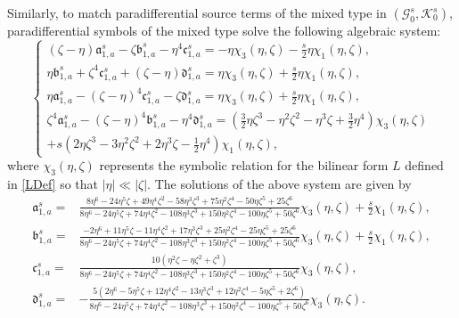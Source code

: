 \documentclass[10pt]{amsart}
\theoremstyle{remark}
\theoremstyle{definition}
\numberwithin{equation}{section}
\newcommand{\f}{\frac}
\begin{document}
Similarly, to match  paradifferential source terms of the mixed type in $(\mathcal{G}_0^s, \mathcal{K}_0^s)$, paradifferential symbols of the mixed type solve the following algebraic system:
\begin{equation*}
\begin{cases}
(\zeta-\eta)\mathfrak{a}^s_{1, a}-\zeta\mathfrak{b}^s_{1, a}-\eta^4\mathfrak{c}^s_{1, a}=-\eta\chi_{3}(\eta,\zeta) -\f{s}{2}\eta \chi_1(\eta, \zeta),\\
\eta\mathfrak{b}^s_{1, a}+\zeta^4\mathfrak{c}^s_{1, a}+(\zeta-\eta)\mathfrak{d}^s_{1, a}=\eta\chi_{3}(\eta,\zeta) + \f{s}{2}\eta \chi_1(\eta, \zeta),\\
\eta\mathfrak{a}^s_{1, a}-(\zeta-\eta)^4\mathfrak{c}^s_{1, a}-\zeta\mathfrak{d}^s_{1, a}=\eta\chi_{3}(\eta,\zeta)+ \f{s}{2}\eta \chi_1(\eta, \zeta),\\
\zeta^4 \mathfrak{a}^s_{1, a}-(\zeta-\eta)^4\mathfrak{b}^s_{1, a}-\eta^4\mathfrak{d}^s_{1, a}=\left(\f32 \eta\zeta^3-\eta^2\zeta^2-\eta^3\zeta +\f32\eta^4\right)\chi_{3}(\eta,\zeta)\\
+ s\left(2 \eta\zeta^3-3\eta^2\zeta^2+2\eta^3\zeta -\f12\eta^4\right)\chi_{1}(\eta,\zeta),
\end{cases}
\end{equation*}
where $\chi_3(\eta, \zeta)$ represents the symbolic relation for the bilinear form $L$ defined in \eqref{LDef} so that $|\eta| \ll |\zeta|$.
The solutions of the above system are given by
\begin{align*}
\mathfrak{a}^s_{1, a}=&\f{ 8\eta^6-24\eta^5\zeta+49\eta^4\zeta^2-58\eta^3\zeta^3+75\eta^2\zeta^4-50\eta\zeta^5+25\zeta^6}{8\eta^6-24\eta^5\zeta+74\eta^4\zeta^2-108\eta^3\zeta^3+150\eta^2\zeta^4-100\eta\zeta^5+50\zeta^6}\chi_{3}(\eta, \zeta) + \f{s}{2}\chi_1(\eta, \zeta),\\
\mathfrak{b}^s_{1, a}=&\f{-2\eta^6+11\eta^5\zeta - 11\eta^4\zeta^2 + 17\eta^3\zeta^3+25\eta^2\zeta^4-25\eta\zeta^5+25\zeta^6}{8\eta^6-24\eta^5\zeta+74\eta^4\zeta^2-108\eta^3\zeta^3+150\eta^2\zeta^4-100\eta\zeta^5+50\zeta^6}\chi_{3}(\eta, \zeta) + \f{s}{2}\chi_1(\eta, \zeta),\\
\mathfrak{c}^s_{1, a}=&\f{10(\eta^2\zeta -\eta\zeta^2 + \zeta^3)}{8\eta^6-24\eta^5\zeta+74\eta^4\zeta^2-108\eta^3\zeta^3+150\eta^2\zeta^4-100\eta\zeta^5+50\zeta^6}\chi_{3}(\eta, \zeta),\\
\mathfrak{d}^s_{1, a}=&-\f{5(2\eta^6-5\eta^5\zeta+12\eta^4\zeta^2-13\eta^3\zeta^3+12\eta^2\zeta^4-5\eta\zeta^5+2\zeta^6)}{8\eta^6-24\eta^5\zeta+74\eta^4\zeta^2-108\eta^3\zeta^3+150\eta^2\zeta^4-100\eta\zeta^5+50\zeta^6}\chi_{3}(\eta, \zeta).
\end{align*}
\end{document}
